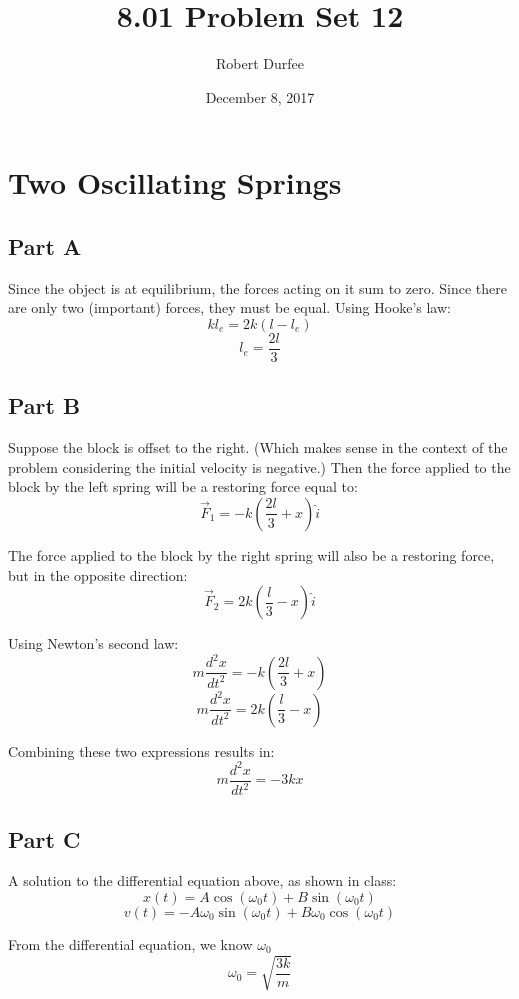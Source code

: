 \documentclass{article}
\title{ 8.01 Problem Set 12 }
\author{ Robert Durfee }
\date{ December 8, 2017 }
\begin{document}
\maketitle

\section{ Two Oscillating Springs }

\subsection*{ Part A }

Since the object is at equilibrium, the forces acting on it sum to zero. Since
there are only two (important) forces, they must be equal. Using Hooke's law:
$$ k l_{e} = 2k( l - l_{e} ) $$
$$ l_{e} = \frac{ 2l }{ 3 } $$

\subsection*{ Part B }

Suppose the block is offset to the right. (Which makes sense in the context of
the problem considering the initial velocity is negative.) Then the force
applied to the block by the left spring will be a restoring force equal to:
$$ \vec{ F }_{1} = -k \left( \frac{ 2l }{ 3 } + x \right) \hat{ i } $$

The force applied to the block by the right spring will also be a restoring
force, but in the opposite direction:
$$ \vec{ F }_{2} = 2k \left( \frac{ l }{ 3 } - x \right) \hat{ i } $$

Using Newton's second law:
$$ m \frac{ d^{2}x }{ dt^{2} } =  -k \left( \frac{ 2l }{ 3 } + x \right) $$
$$ m \frac{ d^{2}x }{ dt^{2} } =  2k \left( \frac{ l }{ 3 } - x \right) $$

Combining these two expressions results in:
$$ m \frac{ d^{2}x }{ dt^{2} } = -3kx $$

\subsection*{ Part C }

A solution to the differential equation above, as shown in class:
$$ x( t ) = A \cos( \omega_{0} t ) + B \sin( \omega_{0} t )$$
$$ v( t ) = -A \omega_{0} \sin( \omega_{0} t ) + B \omega_{0} \cos( \omega_{0} t ) $$

From the differential equation, we know $\omega_{0}$
$$ \omega_{0} = \sqrt{ \frac{ 3k }{ m } } $$
\end{document}
